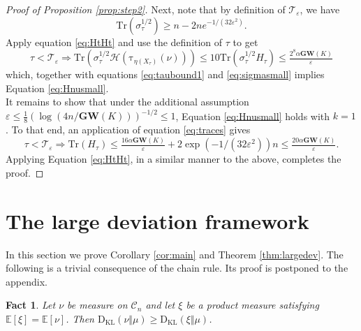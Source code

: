 \documentclass[12pt]{article}
\def \tilt{ \mathrm{\tau} }
\def \EE {\mathbb E}
\def \eps {\varepsilon}
\def \TTT {\mathcal{T}}
\def \tr {\mathrm{Tr}}
\def \DC {\mathcal{C}_n}
\def \MW {\mathbf{GW}}
\def \KL {\mathrm{D}_{\mathrm{KL}}}
\def \HH {\mathcal{H}}
\newtheorem{fact}[theorem]{Fact}
\theoremstyle{definition}
\theoremstyle{remark}
\begin{document}
\begin{proof}[Proof of Proposition \ref{prop:step2}]
Next, note that by definition of $\TTT_\eps$, we have
\begin{equation}\label{eq:sigmasmall}
\tr(\sigma_\tau^{1/2}) \geq n - 2 n e^{-1/(32 \eps^2)}.
\end{equation}
Apply equation \eqref{eq:HtHt} and use the definition of $\tau$ to get
$$
\tau < \TTT_\eps \Rightarrow \tr \left ( \sigma_\tau^{1/2} \HH(\tilt_{\eta(X_\tau)}(\nu)) \right ) \leq 10 \tr \left (\sigma_\tau^{1/2} H_\tau \right ) \leq \tfrac{2^8 \alpha \MW(K) }{\eps}
$$
which, together with equations \eqref{eq:taubound1} and \eqref{eq:sigmasmall} implies Equation \eqref{eq:Hnusmall}.  \\

It remains to show that under the additional assumption $\eps \leq \tfrac 1 8 \left (\log(4n/\MW(K) ) \right  )^{-1/2} \leq 1$, Equation \eqref{eq:Hnusmall} holds with $k=1$. To that end, an application of equation \eqref{eq:traces} gives
$$
\tau < \TTT_\eps \Rightarrow \tr(H_{\tau}) \leq \tfrac{16 \alpha \MW(K)}{\eps} + 2 \exp(-1 / (32 \eps^2)) n \leq \tfrac{20 \alpha \MW(K)}{\eps}.
$$
Applying Equation \eqref{eq:HtHt}, in a similar manner to the above, completes the proof.
\end{proof}

\section{The large deviation framework}

In this section we prove Corollary \ref{cor:main} and Theorem \ref{thm:largedev}. The following is a trivial consequence of the chain rule. Its proof is postponed to the appendix.
\begin{fact} \label{fact:chain}
	Let $\nu$ be measure on $\DC$ and let $\xi$ be a product measure satisfying $\EE[\xi] = \EE[\nu]$. Then $\KL(\nu \Vert \mu) \geq \KL(\xi \Vert \mu)$.
\end{fact}
\end{document}
